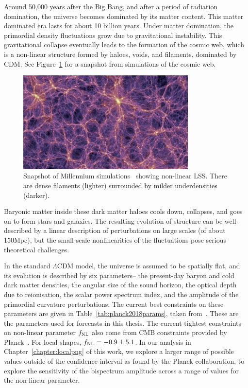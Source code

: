 Around 50,000 years after the Big Bang, and after a period of radiation domination, the universe becomes dominated by its matter content. This matter dominated era lasts for about 10 billion years. Under matter domination, the primordial density fluctuations grow due to gravitational instability. This gravitational collapse eventually leads to the formation of the cosmic web, which is a non-linear structure formed by haloes, voids, and filaments, dominated by CDM. See Figure~\ref{fig:millennium} for a snapshot from simulations of the cosmic web. 

\begin{figure}[ht!]
	\centering
	\includegraphics[width=0.8\textwidth]{fig/Millennium.png}
	\caption{Snapshot of Millennium simulations~\cite{Springel:2005nw} showing non-linear LSS. There are dense filaments (lighter) surrounded by milder underdensities (darker). }
	\label{fig:millennium}
\end{figure}

Baryonic matter inside these dark matter haloes cools down, collapses, and goes on to form stars and galaxies. The resulting evolution of structure can be well-described by a linear description of perturbations on large scales (of about 150Mpc), but the small-scale nonlinearities of the fluctuations pose serious theoretical challenges.

In the standard $\Lambda$CDM model, the universe is assumed to be spatially flat, and its evolution is described by six parameters-- the present-day baryon and cold dark matter densities, the angular size of the sound horizon, the optical depth due to reionisation, the scalar power spectrum index, and the amplitude of the primordial curvature perturbations. The current best constraints on these parameters are given in Table~\ref{tab:planck2018params}, taken from~\cite{Aghanim:2018eyx}. These are the parameters used for forecasts in this thesis. The current tightest constraints on non-linear parameter $f_\text{NL}$ also come from CMB constraints provided by Planck~\cite{Planck:2019kim}. For local shapes, $f_\text{NL} = -0.9 \pm 5.1$. In our analysis in Chapter~\ref{chapter:localpng} of this work, we explore a larger range of possible values outside of the confidence interval as found by the Planck collaboration, to explore the sensitivity of the bispectrum amplitude across a range of values for the non-linear parameter.

